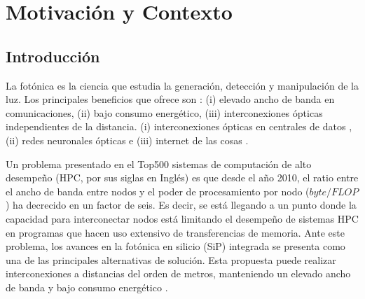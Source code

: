 \chapter{Motivación y Contexto}

\section{Introducción}

La fotónica es la ciencia que estudia la generación, detección y manipulación de la luz. 
Los principales beneficios que ofrece son \citep{Shen2019}:
(i) elevado ancho de banda en comunicaciones, 
(ii) bajo consumo energético,
(iii) interconexiones ópticas independientes de la distancia.
(i) interconexiones ópticas en centrales de datos \citep{Shen2019}, 
(ii) redes neuronales ópticas \citep{Shen2017} e 
(iii) internet de las cosas \citep{Li2021}. 



Un problema presentado en el Top500 sistemas de computación de alto desempeño (HPC, por sus siglas en Inglés) es que desde el año 2010, 
el ratio entre el ancho de banda entre nodos y el poder de procesamiento por nodo ($byte / FLOP$) ha decrecido en un factor de seis.
Es decir, se está llegando a un punto donde la capacidad para interconectar nodos está
limitando el desempeño de sistemas HPC en programas que hacen uso extensivo de transferencias de memoria.
Ante este problema, los avances en la fotónica en silicio (SiP) integrada se presenta como una de las principales alternativas de solución. 
Esta propuesta puede realizar interconexiones a distancias del orden de metros,
manteniendo un elevado ancho de banda y bajo consumo energético \citep{Shen2019, Anderson2018}.

